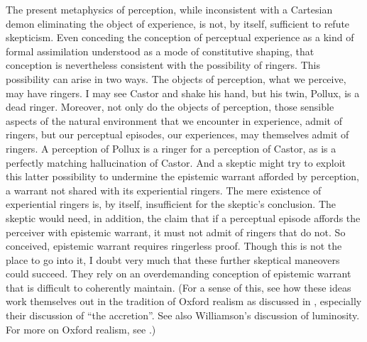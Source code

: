 The present metaphysics of perception, while inconsistent with a Cartesian demon eliminating the object of experience, is not, by itself, sufficient to refute skepticism. Even conceding the conception of perceptual experience as a kind of formal assimilation understood as a mode of constitutive shaping, that conception is nevertheless consistent with the possibility of ringers. This possibility can arise in two ways. The objects of perception, what we perceive, may have ringers. I may see Castor and shake his hand, but his twin, Pollux, is a dead ringer. Moreover, not only do the objects of perception, those sensible aspects of the natural environment that we encounter in experience, admit of ringers, but our perceptual episodes, our experiences, may themselves admit of ringers. A perception of Pollux is a ringer for a perception of Castor, as is a perfectly matching hallucination of Castor. And a skeptic might try to exploit this latter possibility to undermine the epistemic warrant afforded by perception, a warrant not shared with its experiential ringers. The mere existence of experiential ringers is, by itself, insufficient for the skeptic's conclusion. The skeptic would need, in addition, the claim that if a perceptual episode affords the perceiver with epistemic warrant, it must not admit of ringers that do not. So conceived, epistemic warrant requires ringerless proof. Though this is not the place to go into it, I doubt very much that these further skeptical maneovers could succeed. They rely on an overdemanding conception of epistemic warrant that is difficult to coherently maintain. (For a sense of this, see how these ideas work themselves out in the tradition of Oxford realism as discussed in \citealt{Kalderon:2010fk}, especially their discussion of ``the accretion''. See also Williamson's \citealt{Williamson:2000lr} discussion of luminosity. For more on Oxford realism, see \citealt{Marion:2000al,Marion:2000bi}.)

